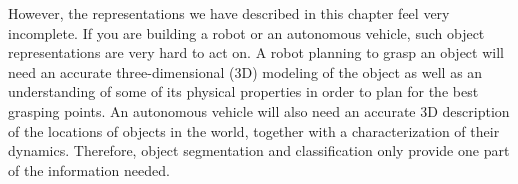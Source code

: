However, the representations we have described in this chapter feel very incomplete. If you are building a robot or an autonomous vehicle, such object representations are very hard to act on. A robot planning to grasp an object will need an accurate three-dimensional (3D) modeling of the object as well as an understanding of some of its physical properties in order to plan for the best grasping points. An autonomous vehicle will also need an accurate 3D description of the locations of objects in the world, together with a characterization of their dynamics. Therefore, object segmentation and classification only provide one part of the information needed.




















